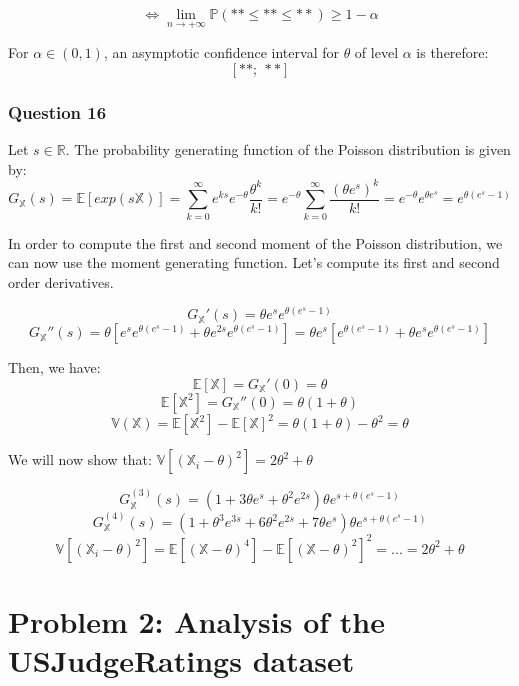 \documentclass[]{article}
\begin{document}
\[
 \Leftrightarrow \lim \limits_{n \rightarrow + \infty} \mathbb{P} (** \leq ** \leq **) \geq 1- \alpha
\]

For \(\alpha \in (0, 1)\), an asymptotic confidence interval for
\(\theta\) of level \(\alpha\) is therefore: \[
[**;\ **]
\]

\hypertarget{question-16}{%
\subsubsection{Question 16}\label{question-16}}

Let \(s \in \mathbb{R}\). The probability generating function of the
Poisson distribution is given by: \[
G_\mathbb{X} (s) = \mathbb{E}[exp(s\mathbb{X})] = \sum _{k=0} ^{\infty} e^{ks} e^{-\theta} \frac{\theta^k}{k!} = e^{-\theta} \sum _{k=0} ^{\infty} \frac{(\theta e^s)^k}{k!} = e^{-\theta} e^{\theta e^{s}} = e^{\theta(e^{s}-1)}
\]

In order to compute the first and second moment of the Poisson
distribution, we can now use the moment generating function. Let's
compute its first and second order derivatives.

\[G_\mathbb{X}' (s) = \theta e^{s} e^{\theta (e^{s}-1)}\]
\[G_\mathbb{X}'' (s) = \theta [e^{s} e^{\theta (e^{s}-1)} + \theta e^{2s} e^{\theta (e^{s}-1)}] = \theta e^{s} [e^{\theta (e^{s}-1)} + \theta e^{s} e^{\theta (e^{s}-1)}]\]

Then, we have: \[\mathbb{E} [\mathbb{X}] = G_\mathbb{X}' (0) = \theta\]
\[\mathbb{E} [\mathbb{X}^2] = G_\mathbb{X}'' (0) = \theta(1 + \theta)\]
\[\mathbb{V}(\mathbb{X}) = \mathbb{E} [\mathbb{X}^2] - \mathbb{E} [\mathbb{X}]^2 = \theta(1 + \theta) - \theta^2 = \theta\]

We will now show that:
\(\mathbb{V}[(\mathbb{X}_i - \theta)^2] = 2 \theta^2 + \theta\)

\[G_\mathbb{X}^{(3)} (s) = (1 + 3 \theta e^{s} + \theta^2 e^{2s}) \theta e^{s + \theta (e^{s}-1)}\]
\[G_\mathbb{X}^{(4)} (s) = (1 + \theta^3 e^{3s} + 6 \theta^2 e^{2s} + 7\theta e^{s}) \theta e^{s + \theta (e^{s}-1)}\]
\[
\mathbb{V}[(\mathbb{X}_i - \theta)^2] = \mathbb{E} [(\mathbb{X} - \theta)^4] - \mathbb{E} [(\mathbb{X} - \theta)^2]^2 = ... = 2 \theta^2 + \theta
\]

\hypertarget{problem-2-analysis-of-the-usjudgeratings-dataset}{%
\section{Problem 2: Analysis of the USJudgeRatings
dataset}\label{problem-2-analysis-of-the-usjudgeratings-dataset}}
\end{document}
